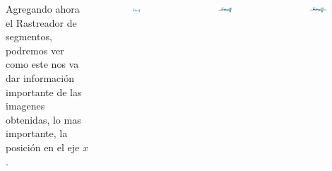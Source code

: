 \begin{frame}
	\begin{columns}
		Agregando ahora el Rastreador de segmentos, podremos ver como este nos va dar información importante de las imagenes obtenidas, lo mas importante, la posición en el eje $x$.

		\begin{figure}
			\begin{center}
				\includegraphics[width=0.5\textwidth]{images/01-vision-artificial/09.png}
			\end{center}
		\end{figure}
		\begin{figure}
			\begin{center}
				\includegraphics[width=0.7\textwidth]{images/01-vision-artificial/10.png}
			\end{center}
		\end{figure}
		\begin{figure}
			\begin{center}
				\includegraphics[width=0.7\textwidth]{images/01-vision-artificial/11.png}
			\end{center}
		\end{figure}
	\end{columns}
\end{frame}

